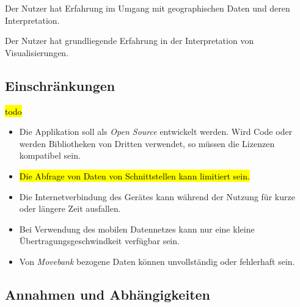 \documentclass[12pt]{article} %
\begin{document}
Der Nutzer hat Erfahrung im Umgang mit geographischen Daten und deren Interpretation.

Der Nutzer hat grundliegende Erfahrung in der Interpretation von Visualisierungen.


\subsection{Einschränkungen}

\hl{todo}

\begin{itemize} 
 	 \item Die Applikation soll als \textit{Open Source} entwickelt werden. Wird Code oder werden Bibliotheken von Dritten verwendet, so müssen die Lizenzen kompatibel sein.
 	 \item \hl{Die Abfrage von Daten von Schnittstellen kann limitiert sein.}
 	 \item Die Internetverbindung des Gerätes kann während der Nutzung für kurze oder längere Zeit ausfallen.
 	 \item Bei Verwendung des mobilen Datennetzes kann nur eine kleine Übertragungsgeschwindkeit verfügbar sein.
 	 \item Von \textit{Movebank} bezogene Daten können unvollständig oder fehlerhaft sein.
\end{itemize} 

\subsection{Annahmen und Abhängigkeiten}

\end{document}
